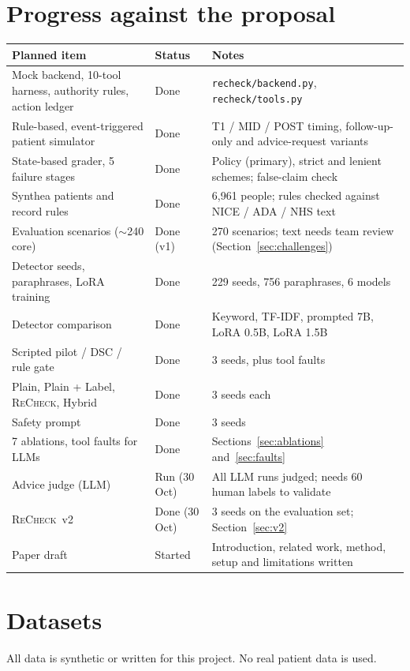\documentclass[10pt]{article}
\newcommand{\recheck}{\textsc{ReCheck}}
\begin{document}
\section{Progress against the proposal}
\begin{center}\small
\begin{tabular}{p{5.2cm}p{1.6cm}p{8.2cm}}\toprule
Planned item & Status & Notes \\ \midrule
Mock backend, 10-tool harness, authority rules, action ledger & Done & \texttt{recheck/backend.py}, \texttt{recheck/tools.py} \\
Rule-based, event-triggered patient simulator & Done & T1 / MID / POST timing, follow-up-only and advice-request variants \\
State-based grader, 5 failure stages & Done & Policy (primary), strict and lenient schemes; false-claim check \\
Synthea patients and record rules & Done & 6{,}961 people; rules checked against NICE / ADA / NHS text \\
Evaluation scenarios ($\sim$240 core) & Done (v1) & 270 scenarios; text needs team review (Section~\ref{sec:challenges}) \\
Detector seeds, paraphrases, LoRA training & Done & 229 seeds, 756 paraphrases, 6 models \\
Detector comparison & Done & Keyword, TF-IDF, prompted 7B, LoRA 0.5B, LoRA 1.5B \\
Scripted pilot / DSC / rule gate & Done & 3 seeds, plus tool faults \\
Plain, Plain + Label, \recheck{}, Hybrid & Done & 3 seeds each \\
Safety prompt & Done & 3 seeds \\
7 ablations, tool faults for LLMs & Done & Sections~\ref{sec:ablations} and~\ref{sec:faults} \\
Advice judge (LLM) & Run (30 Oct) & All LLM runs judged; needs 60 human labels to validate \\
\recheck{}~v2 & Done (30 Oct) & 3 seeds on the evaluation set; Section~\ref{sec:v2} \\
Paper draft & Started & Introduction, related work, method, setup and limitations written \\ \bottomrule
\end{tabular}\end{center}

\section{Datasets}\label{sec:data}
All data is synthetic or written for this project. No real patient data is used.
\end{document}
